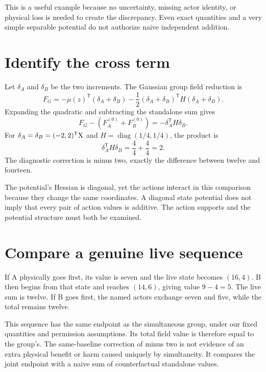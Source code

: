 This is a useful example because no uncertainty, missing actor identity, or physical loss is needed to create the discrepancy. Even exact quantities and a very simple separable potential do not authorize naive independent addition.

\section{Identify the cross term}

Let \(\delta_A\) and \(\delta_B\) be the two increments. The Gaussian group field reduction is
\begin{equation}
F_G=-\mu(z)^{\mathsf T}(\delta_A+\delta_B)
-\frac12(\delta_A+\delta_B)^{\mathsf T}H(\delta_A+\delta_B).
\end{equation}
Expanding the quadratic and subtracting the standalone sum gives
\begin{equation}
F_G-(F_A^{(0)}+F_B^{(0)})=-\delta_A^{\mathsf T}H\delta_B.
\end{equation}
For \(\delta_A=\delta_B=(-2,2)^{\mathsf T}\mathrm{X}\) and \(H=\operatorname{diag}(1/4,1/4)\), the product is
\begin{equation}
\delta_A^{\mathsf T}H\delta_B=\frac{4}{4}+\frac{4}{4}=2.
\end{equation}
The diagnostic correction is minus two, exactly the difference between twelve and fourteen.

The potential's Hessian is diagonal, yet the actions interact in this comparison because they change the same coordinates. A diagonal state potential does not imply that every pair of action values is additive. The action supports and the potential structure must both be examined.

\section{Compare a genuine live sequence}

If A physically goes first, its value is seven and the live state becomes \((16,4)\). B then begins from that state and reaches \((14,6)\), giving value \(9-4=5\). The live sum is twelve. If B goes first, the named actors exchange seven and five, while the total remains twelve.

This sequence has the same endpoint as the simultaneous group, under our fixed quantities and permission assumptions. Its total field value is therefore equal to the group's. The same-baseline correction of minus two is not evidence of an extra physical benefit or harm caused uniquely by simultaneity. It compares the joint endpoint with a naive sum of counterfactual standalone values.

